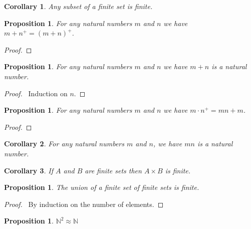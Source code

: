 \documentclass{book}
\let\qed\relax
\newtheorem{prop}[ax]{Proposition}
\newtheorem{cor}{Corollary}[ax]
\theoremstyle{definition}
\begin{document}
\begin{cor}
Any subset of a finite set is finite.
\end{cor}

\begin{prop}
For any natural numbers $m$ and $n$ we have $m + n^+ = (m+n)^+$.
\end{prop}

\begin{proof}
\pf
{}
\qed
\end{proof}

\begin{prop}
For any natural numbers $m$ and $n$ we have $m+n$ is a natural number.
\end{prop}

\begin{proof}
\pf\ Induction on $n$. \qed
\end{proof}

\begin{prop}
For any natural numbers $m$ and $n$ we have $m \cdot n^+ = mn + m$.
\end{prop}

\begin{proof}
\pf
{}
\qed
\end{proof}

\begin{cor}
For any natural numbers $m$ and $n$, we have $mn$ is a natural number.
\end{cor}

\begin{cor}
If $A$ and $B$ are finite sets then $A \times B$ is finite.
\end{cor}

\begin{prop}
The union of a finite set of finite sets is finite.
\end{prop}

\begin{proof}
\pf\ By induction on the number of elements. \qed
\end{proof}

\begin{prop}
$\mathbb{N}^2 \approx \mathbb{N}$
\end{prop}
\end{document}
